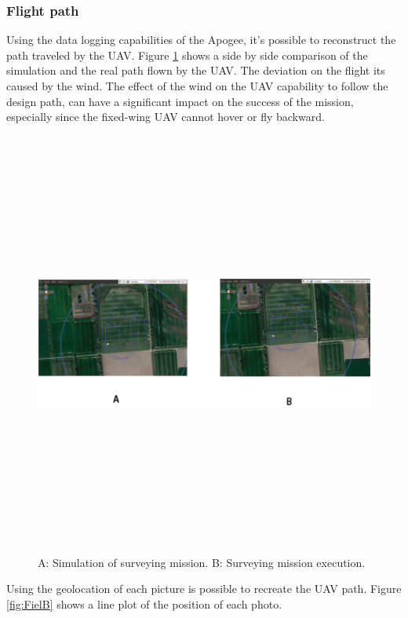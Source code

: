 \subsubsection{Flight path}
Using the data logging capabilities of the Apogee, it's possible to reconstruct the path traveled by the UAV.
Figure \ref{fig:SimVReal} shows a side by side comparison of the simulation and the real path flown by the UAV. The deviation on the flight its caused by the wind. The effect of the wind on the UAV capability to follow the design path, can have a significant impact on the success of the mission, especially since the fixed-wing UAV cannot hover or fly backward. 
\begin{figure}[H]
\centering
\includegraphics[width=14cm,height=14cm,keepaspectratio]{imagenes/SimVsreallity.png}
\caption{ A: Simulation of surveying mission. B: Surveying mission execution.}
\label{fig:SimVReal}
\end{figure}
Using the geolocation of each picture is possible to recreate the UAV path. Figure \ref{fig:FielB} shows a line plot of the position of each photo.
